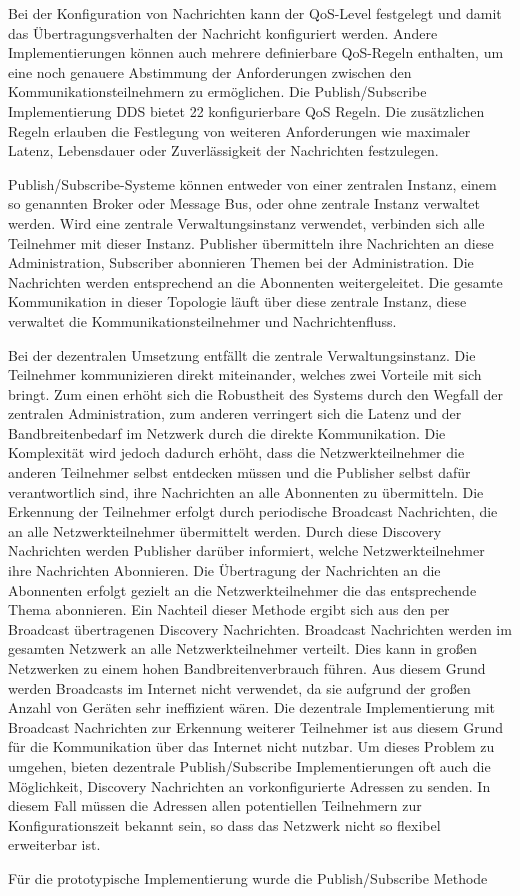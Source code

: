 Bei der Konfiguration von Nachrichten kann der \gls{QoS}-Level festgelegt und damit das Übertragungsverhalten der Nachricht konfiguriert werden. Andere Implementierungen können auch mehrere definierbare \gls{QoS}-Regeln enthalten, um eine noch genauere Abstimmung der Anforderungen zwischen den Kommunikationsteilnehmern zu ermöglichen. Die Publish/Subscribe Implementierung \gls{DDS} bietet 22 konfigurierbare \gls{QoS} Regeln. Die zusätzlichen Regeln erlauben die Festlegung von weiteren Anforderungen wie maximaler Latenz, Lebensdauer oder Zuverlässigkeit der Nachrichten festzulegen. 

Publish/Subscribe-Systeme können entweder von einer zentralen Instanz, einem so genannten Broker oder Message Bus, oder ohne zentrale Instanz verwaltet werden. Wird eine zentrale Verwaltungsinstanz verwendet, verbinden sich alle Teilnehmer mit dieser Instanz. Publisher übermitteln ihre Nachrichten an diese Administration, Subscriber abonnieren Themen bei der Administration. Die Nachrichten werden entsprechend an die Abonnenten weitergeleitet. Die gesamte Kommunikation in dieser Topologie läuft über diese zentrale Instanz, diese verwaltet die Kommunikationsteilnehmer und Nachrichtenfluss.

Bei der dezentralen Umsetzung entfällt die zentrale Verwaltungsinstanz. Die Teilnehmer kommunizieren direkt miteinander, welches zwei Vorteile mit sich bringt. Zum einen erhöht sich die Robustheit des Systems durch den Wegfall der zentralen Administration, zum anderen verringert sich die Latenz und der Bandbreitenbedarf im Netzwerk durch die direkte Kommunikation. Die Komplexität wird jedoch dadurch erhöht, dass die Netzwerkteilnehmer die anderen Teilnehmer selbst entdecken 
müssen und die Publisher selbst dafür verantwortlich sind, ihre Nachrichten an alle Abonnenten zu übermitteln. Die Erkennung der Teilnehmer erfolgt durch periodische Broadcast Nachrichten, die an alle Netzwerkteilnehmer übermittelt werden. Durch diese Discovery Nachrichten werden Publisher darüber informiert, welche Netzwerkteilnehmer ihre Nachrichten Abonnieren. Die Übertragung der Nachrichten an die Abonnenten erfolgt gezielt an die Netzwerkteilnehmer die das entsprechende Thema abonnieren. Ein Nachteil dieser Methode ergibt sich aus den per Broadcast übertragenen Discovery Nachrichten. Broadcast Nachrichten werden im gesamten Netzwerk an alle Netzwerkteilnehmer verteilt. Dies kann in großen Netzwerken zu einem hohen Bandbreitenverbrauch führen. Aus diesem Grund werden Broadcasts im Internet nicht verwendet, da sie aufgrund der großen Anzahl von Geräten sehr ineffizient wären. Die dezentrale Implementierung mit Broadcast Nachrichten zur Erkennung weiterer Teilnehmer ist aus diesem Grund für die Kommunikation über das Internet nicht nutzbar. Um dieses Problem zu umgehen, bieten dezentrale Publish/Subscribe Implementierungen oft auch die Möglichkeit, Discovery Nachrichten an vorkonfigurierte Adressen zu senden. In diesem Fall müssen die Adressen allen potentiellen Teilnehmern zur Konfigurationszeit bekannt sein, so dass das Netzwerk nicht so flexibel erweiterbar ist.

Für die prototypische Implementierung wurde die Publish/Subscribe Methode
